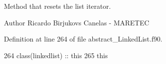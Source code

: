 Method that resets the list iterator. 

\begin{DoxyAuthor}{Author}
Ricardo Birjukovs Canelas -\/ M\+A\+R\+E\+T\+EC 
\end{DoxyAuthor}


Definition at line 264 of file abstract\+\_\+\+Linked\+List.\+f90.


\begin{DoxyCode}
264     \textcolor{keywordtype}{class}(linkedlist) :: this
265     this%
\end{DoxyCode}
